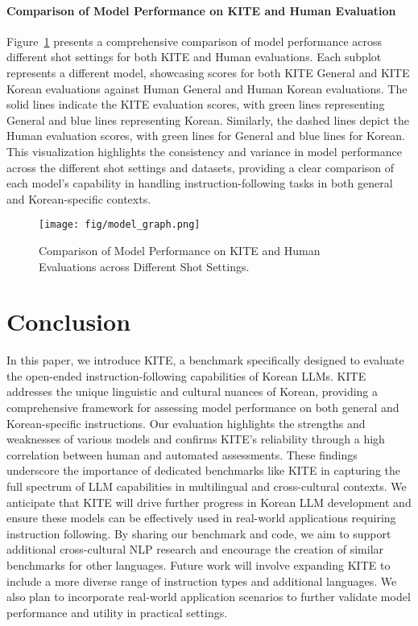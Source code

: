     \paragraph{Comparison of Model Performance on KITE and Human Evaluation}
    Figure~\ref{fig:model_graph} presents a comprehensive comparison of model performance across different shot settings for both KITE and Human evaluations. Each subplot represents a different model, showcasing scores for both KITE General and KITE Korean evaluations against Human General and Human Korean evaluations. The solid lines indicate the KITE evaluation scores, with green lines representing General and blue lines representing Korean. Similarly, the dashed lines depict the Human evaluation scores, with green lines for General and blue lines for Korean. This visualization highlights the consistency and variance in model performance across the different shot settings and datasets, providing a clear comparison of each model's capability in handling instruction-following tasks in both general and Korean-specific contexts.

    \begin{figure}[t]
        \centering
        \texttt{[image: fig/model\_graph.png]}
        \caption{Comparison of Model Performance on KITE and Human Evaluations across Different Shot Settings.}
        \label{fig:model_graph}
    \end{figure}

    \section{Conclusion}
    In this paper, we introduce KITE, a benchmark specifically designed to evaluate the open-ended instruction-following capabilities of Korean LLMs. KITE addresses the unique linguistic and cultural nuances of Korean, providing a comprehensive framework for assessing model performance on both general and Korean-specific instructions. Our evaluation highlights the strengths and weaknesses of various models and confirms KITE’s reliability through a high correlation between human and automated assessments. These findings underscore the importance of dedicated benchmarks like KITE in capturing the full spectrum of LLM capabilities in multilingual and cross-cultural contexts. We anticipate that KITE will drive further progress in Korean LLM development and ensure these models can be effectively used in real-world applications requiring instruction following. By sharing our benchmark and code, we aim to support additional cross-cultural NLP research and encourage the creation of similar benchmarks for other languages. Future work will involve expanding KITE to include a more diverse range of instruction types and additional languages. We also plan to incorporate real-world application scenarios to further validate model performance and utility in practical settings.